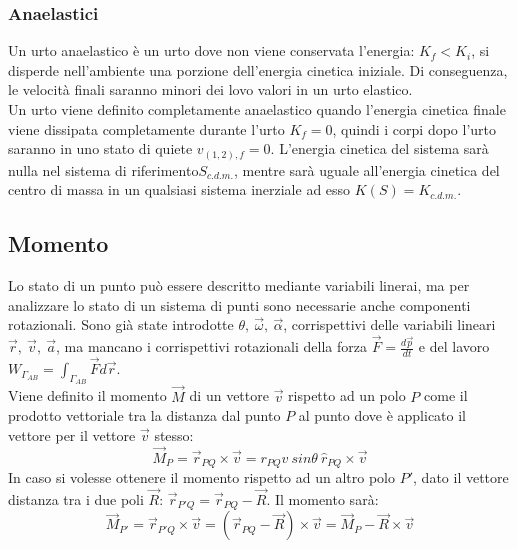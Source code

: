 \documentclass{article}
\numberwithin{equation}{subsection}
\begin{document}
\subsubsection{Anaelastici}
Un urto anaelastico è un urto dove non viene conservata 
l'energia: $K_f<K_i$, si disperde nell'ambiente una porzione 
dell'energia cinetica iniziale. Di conseguenza, le velocità 
finali saranno minori dei lovo valori in un urto elastico. \\
Un urto viene definito completamente anaelastico quando l'energia 
cinetica finale viene dissipata completamente durante l'urto $K_f=0$, quindi i 
corpi dopo l'urto saranno in uno stato di quiete $v_{(1,2),f}=0$. 
L'energia cinetica del sistema sarà nulla nel sistema di 
riferimento$S_{c.d.m.}$, mentre sarà uguale all'energia 
cinetica del centro di massa in un qualsiasi sistema inerziale 
ad esso $K(S)=K_{c.d.m.}$.

\subsection{Momento}
Lo stato di un punto può essere descritto mediante variabili 
linerai, ma per analizzare lo stato di un sistema di punti 
sono necessarie anche componenti rotazionali. Sono già state 
introdotte $\theta,\:\vec{\omega},\:\vec{\alpha}$, corrispettivi 
delle variabili lineari $\vec{r},\:\vec{v},\:\vec{a}$, ma 
mancano i corrispettivi rotazionali della forza $\vec{F}=\displaystyle\frac{d\vec{p}}{dt}$ 
e del lavoro $W_{\Gamma_{AB}}=\displaystyle\int_{\Gamma_{AB}}\vec{F}d\vec{r}$. \\

Viene definito il momento $\vec{M}$ di un vettore $\vec{v}$ rispetto ad 
un polo $P$ come il prodotto vettoriale tra la distanza dal punto 
$P$ al punto dove è applicato il vettore per il vettore $\vec{v}$ stesso: 
\begin{equation}
    \vec{M}_P=\vec{r}_{PQ}\times\vec{v}=r_{PQ}v\:sin\theta\:\hat{r}_{PQ}\times\vec{v}
\end{equation}
In caso si volesse ottenere il momento rispetto ad un altro polo 
$P'$, dato  il vettore distanza tra i due poli $\vec{R}$: 
$\vec{r}_{P'Q}=\vec{r}_{PQ}-\vec{R}$. Il momento sarà:
\begin{equation}
    \vec{M}_{P'}=\vec{r}_{P'Q}\times\vec{v}=(\vec{r}_{PQ}-\vec{R})\times\vec{v}=\vec{M}_P-\vec{R}\times\vec{v}
\end{equation}

\begin{center}\end{center}
\end{document}
